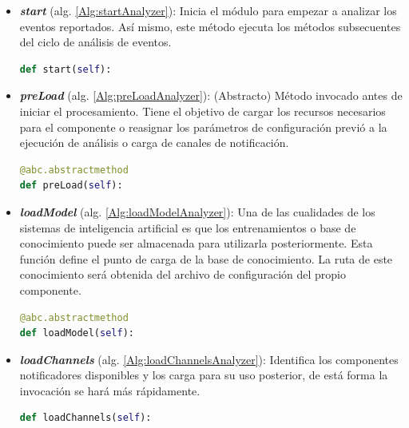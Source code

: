         \begin{itemize}
        
            \item \textbf{\textit{start}} (alg. \ref{Alg:startAnalyzer}): 
            Inicia el módulo para empezar a analizar los eventos reportados. Así mismo, este método ejecuta los métodos subsecuentes del ciclo de análisis de eventos.
            \begin{lstlisting}[language=Python, caption={Firma del método "\textit{start}" de la clase EventAnalyzer.}, label=Alg:startAnalyzer, numbers=none]
def start(self):
            \end{lstlisting}
            
            \item \textbf{\textit{preLoad}} (alg. \ref{Alg:preLoadAnalyzer}):
            (Abstracto) Método invocado antes de iniciar el procesamiento. Tiene el objetivo de cargar los recursos necesarios para el componente o reasignar los parámetros de configuración previó a la ejecución de análisis o carga de canales de notificación.
            \begin{lstlisting}[language=Python, caption={Firma del método "\textit{preLoad}" de la clase EventAnalyzer.}, label=Alg:preLoadAnalyzer, numbers=none]
@abc.abstractmethod
def preLoad(self):
            \end{lstlisting}
            
            \item \textbf{\textit{loadModel}} (alg. \ref{Alg:loadModelAnalyzer}):
            Una de las cualidades de los sistemas de inteligencia artificial es que los entrenamientos o base de conocimiento puede ser almacenada para utilizarla posteriormente. Esta función define el punto de carga de la base de conocimiento. La ruta de este conocimiento será obtenida del archivo de configuración del propio componente. 
            \begin{lstlisting}[language=Python, caption={Firma del método "\textit{loadModel}" de la clase EventAnalyzer.}, label=Alg:loadModelAnalyzer, numbers=none]
@abc.abstractmethod
def loadModel(self):
            \end{lstlisting}
            
            \item \textbf{\textit{loadChannels}} (alg. \ref{Alg:loadChannelsAnalyzer}):
            Identifica los componentes notificadores disponibles y los carga para su uso posterior, de está forma la invocación se hará más rápidamente.
            \begin{lstlisting}[language=Python, caption={Firma del método "\textit{loadChannels}" de la clase EventAnalyzer.}, label=Alg:loadChannelsAnalyzer, numbers=none]
def loadChannels(self):
            \end{lstlisting}
            

\end{itemize}
